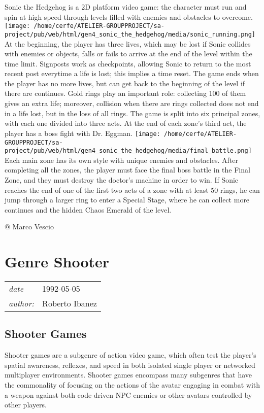 \documentclass[a4paper,10pt]{book}
\newcommand{\pageHeader}[4]{
    \section{#1}
    \vspace{-0.3cm}
    \begin{table}[h!]
     \begin{tabular}{ll}
        \hline
        \textit{date} & #2 \\
        \textit{author: } & #3\\
        \hline
     \end{tabular}
    \end{table}
    \vspace{-0.3cm}
}
\begin{document}
          Sonic the Hedgehog is a 2D platform video game: the character must run and spin at high speed through levels filled with enemies and obstacles to overcome. 
 \texttt{[image: /home/cerfe/ATELIER-GROUPPROJECT/sa-project/pub/web/html/gen4\_sonic\_the\_hedgehog/media/sonic\_running.png]}
          At the beginning, the player has three lives, which may be lost if Sonic collides with enemies or objects, falls or fails to arrive at the end of the level within the time limit. 
          Signposts work as checkpoints, allowing Sonic to return to the most recent post everytime a life is lost; this implies a time reset. The game ends when the player has no more lives, but can get back to the beginning of the level if there are continues. Gold rings play an important role: collecting 100 of them gives an extra life; moreover, collision when there are rings collected does not end in a life lost, but in the loss of all rings. 
          The game is split into six principal zones, with each one divided into three acts. At the end of each zone's third act, the player has a boss fight with Dr. Eggman. 
 \texttt{[image: /home/cerfe/ATELIER-GROUPPROJECT/sa-project/pub/web/html/gen4\_sonic\_the\_hedgehog/media/final\_battle.png]}
          Each main zone has its own style with unique enemies and obstacles. After completing all the zones, the player must face the final boss battle in the Final Zone, and they must destroy the doctor's machine in order to win.
           If Sonic reaches the end of one of the first two acts of a zone with at least 50 rings, he can jump through a larger ring to enter a Special Stage, where he can collect more continues and the hidden Chaos Emerald of the level. 
 
 
 @ Marco Vescio 
 
 \newpage\pageHeader{Genre Shooter}{1992-05-05}{Roberto Ibanez}{Shooter games become mainstream}
 \subsection{Shooter Games  }
 
            Shooter games are a subgenre of action video game, which often test the player's spatial awareness, reflexes, and speed in both isolated single player or networked multiplayer environments. 
            Shooter games encompass many subgenres that have the commonality of focusing on the actions of the avatar engaging in combat with a weapon against both code-driven NPC enemies or other avatars controlled by other players.
         
\end{document}
